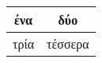 \begin{center} \color{blue}

    \begin{tabular}{c|c}

      ένα  & δύο \\ \hline
      τρία & τέσσερα

    \end{tabular}

\end{center}